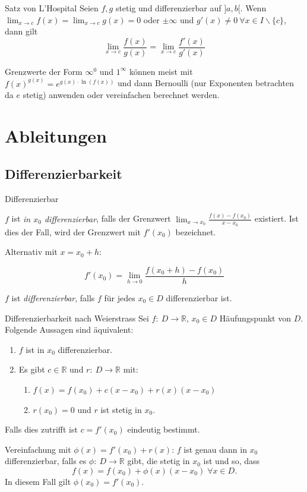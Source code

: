 \documentclass[a4paper,10pt]{article}
\def\R{\mathbb{R}}
\begin{document}
\begin{subbox}{Satz von L'Hospital}
  Seien $f,g$ stetig und differenzierbar auf $]a,b[$. Wenn $\lim_{x\to c} f(x) = \lim_{x \to c} g(x) = 0$ oder $\pm \infty$ und $g'(x) \ne 0 \ \forall x \in I \backslash \{c\}$, dann gilt $$\lim_{x\to c} \frac{f(x)}{g(x)} = \lim_{x\to c}\frac{f'(x)}{g'(x)}$$
\end{subbox}

Grenzwerte der Form $\infty^0$ und $1^\infty$ können meist mit $f(x)^{g(x)} = e^{g(x)\cdot \ln(f(x))}$ und dann Bernoulli (nur Exponenten betrachten da $e$ stetig) anwenden oder vereinfachen berechnet werden.

\section{Ableitungen}
\subsection{Differenzierbarkeit}
\begin{mainbox}{Differenzierbar}
\begin{mainbox}{}
 $f$ ist \emph{in $x_0$ differenzierbar}, falls der Grenzwert $\lim_{x\to x_0} \frac{f(x) - f(x_0)}{x - x_0}$ existiert. Ist dies der Fall, wird der Grenzwert mit $f'(x_0)$ bezeichnet.
\end{mainbox}

Alternativ mit $x = x_0 + h$:
\begin{subbox}{}
\[ f'(x_0) = \lim_{h \to 0} \frac{f(x_0 + h) - f(x_0)}{h} \]
\end{subbox}

 $f$ ist \emph{differenzierbar}, falls $f$ für jedes $x_0 \in D$ differenzierbar ist.
\end{mainbox}
\begin{subbox}{Differenzierbarkeit nach Weierstrass}
Sei $f: \: D \to \R$, $x_0 \in D$ Häufungspunkt von $D$. Folgende Aussagen sind äquivalent:
\begin{enumerate}
    \item $f$ ist in $x_0$ differenzierbar.
    \item Es gibt $c \in \R$ und $r: \: D \to \R$ mit:
    \begin{enumerate}
        \item $f(x) = f(x_0) + c(x - x_0) + r(x)(x - x_0)$
        \item $r(x_0) = 0$ und $r$ ist stetig in $x_0$.
    \end{enumerate}
\end{enumerate}
Falls dies zutrifft ist $c = f'(x_0)$ eindeutig bestimmt.
\end{subbox}
Vereinfachung mit $\phi(x) = f'(x_0) + r(x)$:
$f$ ist genau dann in $x_0$ differenzierbar, falls es $\phi: \: D \to \R$ gibt, die stetig in $x_0$ ist und so, dass
\[ f(x) = f(x_0) + \phi(x)(x - x_0) \; \forall x \in D \text{.} \]
In diesem Fall gilt $\phi(x_0) = f'(x_0)$.
\end{document}
